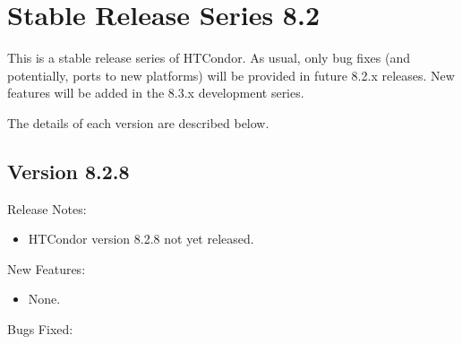 
\section{\label{sec:History-8-2}Stable Release Series 8.2}

This is a stable release series of HTCondor.
As usual, only bug fixes (and potentially, ports to new platforms)
will be provided in future 8.2.x releases.
New features will be added in the 8.3.x development series.

The details of each version are described below.


\subsection*{\label{sec:New-8-2-8}Version 8.2.8}

\noindent Release Notes:

\begin{itemize}

\item HTCondor version 8.2.8 not yet released.

\end{itemize}


\noindent New Features:

\begin{itemize}

\item None.

\end{itemize}

\noindent Bugs Fixed:

